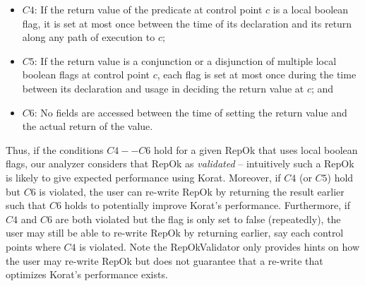 \begin{itemize}
\item $C4$: If the return value of the predicate at control point $c$ is
  a local boolean flag, it is set at most once between the time of its
  declaration and its return along any path of execution to $c$;
\item $C5$: If the return value is a conjunction or a disjunction of
  multiple local boolean flags at control point $c$, each flag is set
  at most once during the time between its declaration and usage in
  deciding the return value at $c$; and
\item $C6$: No fields are accessed between the time of setting the
  return value and the actual return of the value.
\end{itemize}

Thus, if the conditions $C4--C6$ hold for a given RepOk that uses
local boolean flags, our analyzer considers that RepOk as
\emph{validated} -- intuitively such a RepOk is likely to give
expected performance using Korat.  Moreover, if $C4$ (or $C5$) hold
but $C6$ is violated, the user can re-write RepOk by returning the
result earlier such that $C6$ holds to potentially improve Korat's
performance.  Furthermore, if $C4$ and $C6$ are both violated but the
flag is only set to false (repeatedly), the user may still be able to
re-write RepOk by returning earlier, say each control points where
$C4$ is violated.  Note the RepOkValidator only provides hints on how
the user may re-write RepOk but does not guarantee that a re-write
that optimizes Korat's performance exists.

